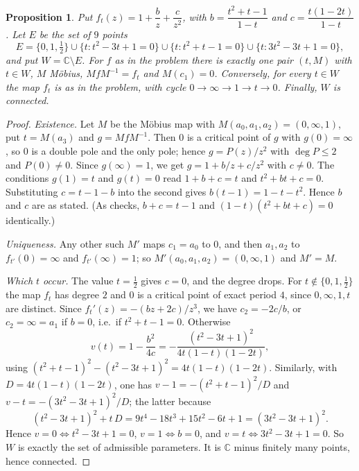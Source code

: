 \documentclass[11pt]{article}
\newtheorem{proposition}{Proposition}[section]
\theoremstyle{definition}
\begin{document}
\begin{proposition}\label{prop:normal}
Put $f_t(z)=1+\dfrac bz+\dfrac c{z^2}$, with $b=\dfrac{t^2+t-1}{1-t}$ and $c=\dfrac{t(1-2t)}{1-t}$. Let $E$ be the set of $9$ points
\[E=\{0,1,\tfrac12\}\cup\{t:t^2-3t+1=0\}\cup\{t:t^2+t-1=0\}\cup\{t:3t^2-3t+1=0\},\]
and put $W=\mathbb C\setminus E$. For $f$ as in the problem there is exactly one pair $(t,M)$ with $t\in W$, $M$ M\"obius, $MfM^{-1}=f_t$ and $M(c_1)=0$. Conversely, for every $t\in W$ the map $f_t$ is as in the problem, with cycle $0\to\infty\to1\to t\to0$. Finally, $W$ is connected.
\end{proposition}


\begin{proof}
\emph{Existence.} Let $M$ be the M\"obius map with $M(a_0,a_1,a_2)=(0,\infty,1)$, put $t=M(a_3)$ and $g=MfM^{-1}$. Then $0$ is a critical point of $g$ with $g(0)=\infty$, so $0$ is a double pole and the only pole; hence $g=P(z)/z^2$ with $\deg P\le2$ and $P(0)\ne0$. Since $g(\infty)=1$, we get $g=1+b/z+c/z^2$ with $c\ne0$. The conditions $g(1)=t$ and $g(t)=0$ read $1+b+c=t$ and $t^2+bt+c=0$. Substituting $c=t-1-b$ into the second gives $b(t-1)=1-t-t^2$. Hence $b$ and $c$ are as stated. (As checks, $b+c=t-1$ and $(1-t)(t^2+bt+c)=0$ identically.)

\emph{Uniqueness.} Any other such $M'$ maps $c_1=a_0$ to $0$, and then $a_1,a_2$ to $f_{t'}(0)=\infty$ and $f_{t'}(\infty)=1$; so $M'(a_0,a_1,a_2)=(0,\infty,1)$ and $M'=M$.

\emph{Which $t$ occur.} The value $t=\tfrac12$ gives $c=0$, and the degree drops. For $t\notin\{0,1,\tfrac12\}$ the map $f_t$ has degree $2$ and $0$ is a critical point of exact period $4$, since $0,\infty,1,t$ are distinct. Since $f_t'(z)=-(bz+2c)/z^3$, we have $c_2=-2c/b$, or $c_2=\infty=a_1$ if $b=0$, i.e.\ if $t^2+t-1=0$. Otherwise
\[v(t)=1-\frac{b^2}{4c}=-\frac{(t^2-3t+1)^2}{4t(1-t)(1-2t)},\]
using $(t^2+t-1)^2-(t^2-3t+1)^2=4t(1-t)(1-2t)$. Similarly, with $D=4t(1-t)(1-2t)$, one has $v-1=-(t^2+t-1)^2/D$ and $v-t=-(3t^2-3t+1)^2/D$; the latter because
\[(t^2-3t+1)^2+t\,D=9t^4-18t^3+15t^2-6t+1=(3t^2-3t+1)^2.\]
Hence $v=0\iff t^2-3t+1=0$, $v=1\iff b=0$, and $v=t\iff 3t^2-3t+1=0$. So $W$ is exactly the set of admissible parameters. It is $\mathbb C$ minus finitely many points, hence connected.
\end{proof}
\end{document}
